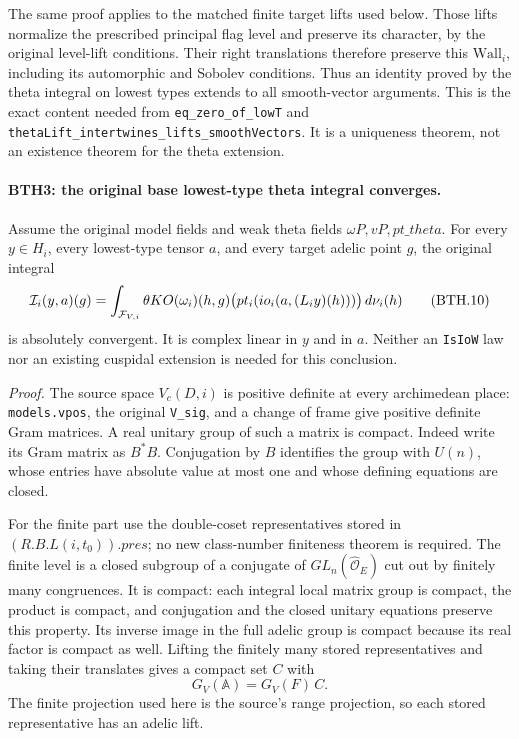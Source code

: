 The same proof applies to the matched finite target lifts used
below.  Those lifts normalize the prescribed principal flag
level and preserve its character, by the original level-lift
conditions.  Their right translations therefore preserve this
\(\mathrm{Wall}_i\), including its automorphic and Sobolev
conditions.  Thus an identity proved by the theta
integral on lowest types extends to all smooth-vector
arguments.  This is the exact content needed from
\texttt{eq\_\allowbreak zero\_\allowbreak of\_\allowbreak low\allowbreak T} and
\texttt{theta\allowbreak Lift\_\allowbreak intertwines\_\allowbreak lifts\_\allowbreak smooth\allowbreak Vectors}.
It is a uniqueness theorem, not an existence theorem for the
theta extension.

\paragraph{BTH3: the original base lowest-type theta integral converges.}
\label{claim:BTH3}
Assume the original model fields and weak theta fields
\(\omega P,vP,pt\_theta\).  For every \(y\in H_i\), every
lowest-type tensor \(a\), and every target adelic point \(g\),
the original integral
\[
 {\cal I}_i(y,a)(g)=
 \int_{\mathcal F_{V,i}}
  \theta KO(\omega_i)(h,g)
       \bigl(pt_i(io_i(a,(L_i y)(h)))\bigr)\,d\nu_i(h)            \tag{BTH.10}
\]
is absolutely convergent.  It is complex linear in \(y\)
and in \(a\).  Neither an \texttt{Is\allowbreak Io\allowbreak W} law nor an existing
cuspidal extension is needed for this conclusion.

\emph{Proof.}
The source space \(V_c(D,i)\) is positive definite at every
archimedean place: \texttt{models.vpos}, the original
\texttt{V\_\allowbreak sig}, and a change of frame give positive definite
Gram matrices.  A real unitary group of such a matrix is compact.
Indeed write its Gram matrix as \(B^*B\).  Conjugation by \(B\)
identifies the group with \(U(n)\), whose entries have absolute
value at most one and whose defining equations are closed.

For the finite part use the double-coset representatives
stored in \((R.B.L(i,t_0)).pres\); no new class-number
finiteness theorem is required.  The finite level is a closed
subgroup of a conjugate of \(GL_n(\widehat{\mathcal O}_E)\)
cut out by finitely many congruences.  It is compact: each
integral local matrix group is compact, the product is compact,
and conjugation and the closed unitary equations preserve this
property.  Its inverse image in the full adelic group is compact
because its real factor is compact as well.  Lifting the finitely
many stored representatives and taking their translates gives
a compact set \(C\) with
\[
       G_V(\mathbb A)=G_V(F)\,C.                                \tag{BTH.11}
\]
The finite projection used here is the source's range
projection, so each stored representative has an adelic lift.

